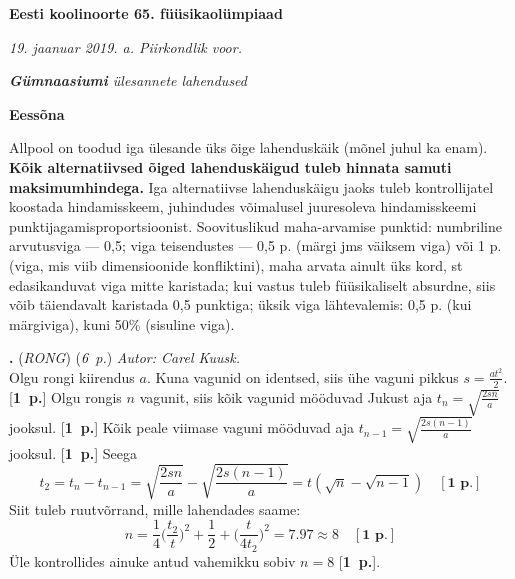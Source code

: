 \documentclass[12pt,a5paper]{article}
\newcommand{\numb}[1]{\vspace{5pt}\textbf{\large #1}}
\newcommand{\nimi}[1]{(\textsl{\small #1})}
\newcommand{\punktid}[1]{(\emph{#1~p.})}
\newcounter{ylesanne}
\newcommand{\yl}[1]{\addtocounter{ylesanne}{1}\numb{\theylesanne.} \nimi{#1} \newblock{}}
\newcommand{\pp}[1]{[\textbf{#1~p.}]}
\newcommand{\autor}[1]{\emph{ Autor: #1.\\}}
\begin{document}
\begin{center}
\textbf{\Large Eesti koolinoorte 65. füüsikaolümpiaad} \vspace{2pt}

\emph{19. jaanuar 2019. a. Piirkondlik voor.}

\emph{{\bf Gümnaasiumi} ülesannete lahendused}


\end{center}

\numb{Eessõna}

Allpool on toodud iga ülesande üks õige lahenduskäik (mõnel juhul ka
enam). \textbf{Kõik alternatiivsed õiged lahenduskäigud tuleb hinnata samuti maksimumhindega.} Iga alternatiivse lahenduskäigu jaoks tuleb
kontrollijatel koostada hindamisskeem, juhindudes võimalusel juuresoleva
hindamisskeemi punktijagamisproportsioonist. Soovituslikud
maha-arvamise punktid: numbriline arvutusviga --- 0,5; viga
teisendustes --- 0,5 p. (märgi jms väiksem viga) või 1 p. (viga, mis
viib dimensioonide konf\/liktini), maha arvata ainult üks kord, st
edasikanduvat viga mitte karistada; kui vastus tuleb füüsikaliselt
absurdne, siis võib täiendavalt karistada 0,5 punktiga; üksik viga
lähtevalemis: 0,5 p. (kui märgiviga), kuni 50\% (sisuline viga).

\yl{RONG} \punktid{6} \autor{Carel Kuusk}
Olgu rongi kiirendus $a$. Kuna vagunid on identsed, siis ühe vaguni pikkus $s=\frac{at^2}{2}$. \pp{1} Olgu rongis $n$ vagunit, siis kõik vagunid mööduvad Jukust 
aja $t_n=\sqrt{\frac{2sn}{a}}$ jooksul. \pp{1} Kõik peale viimase vaguni mööduvad aja $t_{n-1}=\sqrt{\frac{2s(n-1)}{a}}$ jooksul. \pp{1} Seega 
$$t_2=t_n-t_{n-1}=\sqrt{\frac{2sn}{a}}-\sqrt{\frac{2s(n-1)}{a}}=t(\sqrt{n}-\sqrt{n-1}) \quad \pp{1}$$
Siit tuleb ruutvõrrand, mille lahendades saame:
$$n = \frac{1}{4}\bigg(\frac{t_2}{t}\bigg)^2 + \frac{1}{2} + \bigg(\frac{t}{4t_2}\bigg)^2 = 7.97 \approx 8 \quad \pp{1}$$
Üle kontrollides ainuke antud vahemikku sobiv $n=8$ \pp{1}. 
\end{document}
